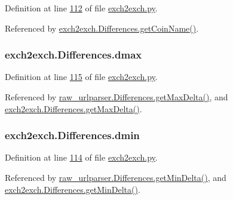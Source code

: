 Definition at line \hyperlink{exch2exch_8py_source_l00112}{112} of file \hyperlink{exch2exch_8py_source}{exch2exch.\+py}.



Referenced by \hyperlink{exch2exch_8py_source_l00150}{exch2exch.\+Differences.\+get\+Coin\+Name()}.

\subsubsection[{\texorpdfstring{dmax}{dmax}}]{\setlength{\rightskip}{0pt plus 5cm}exch2exch.\+Differences.\+dmax}\hypertarget{classexch2exch_1_1_differences_a261a74cc25d77b2608898fa5611f9f0b}{}\label{classexch2exch_1_1_differences_a261a74cc25d77b2608898fa5611f9f0b}


Definition at line \hyperlink{exch2exch_8py_source_l00115}{115} of file \hyperlink{exch2exch_8py_source}{exch2exch.\+py}.



Referenced by \hyperlink{raw__urlparser_8py_source_l00097}{raw\+\_\+urlparser.\+Differences.\+get\+Max\+Delta()}, and \hyperlink{exch2exch_8py_source_l00129}{exch2exch.\+Differences.\+get\+Max\+Delta()}.

\subsubsection[{\texorpdfstring{dmin}{dmin}}]{\setlength{\rightskip}{0pt plus 5cm}exch2exch.\+Differences.\+dmin}\hypertarget{classexch2exch_1_1_differences_a7825bfca16b5775aa770c8810412b215}{}\label{classexch2exch_1_1_differences_a7825bfca16b5775aa770c8810412b215}


Definition at line \hyperlink{exch2exch_8py_source_l00114}{114} of file \hyperlink{exch2exch_8py_source}{exch2exch.\+py}.



Referenced by \hyperlink{raw__urlparser_8py_source_l00094}{raw\+\_\+urlparser.\+Differences.\+get\+Min\+Delta()}, and \hyperlink{exch2exch_8py_source_l00126}{exch2exch.\+Differences.\+get\+Min\+Delta()}.

